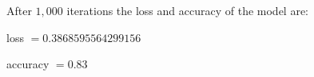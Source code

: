 \documentclass [a4paper, 11pt] {article}
\begin{document}
\begin{enumerate}
\bigskip
\bigskip
\bigskip

After $1,000$ iterations the loss and accuracy of the model are:

	\qquad loss $= 0.3868595564299156$
	
	\qquad accuracy $= 0.83$


\end{enumerate}
	
	
	

	
\end{document}
